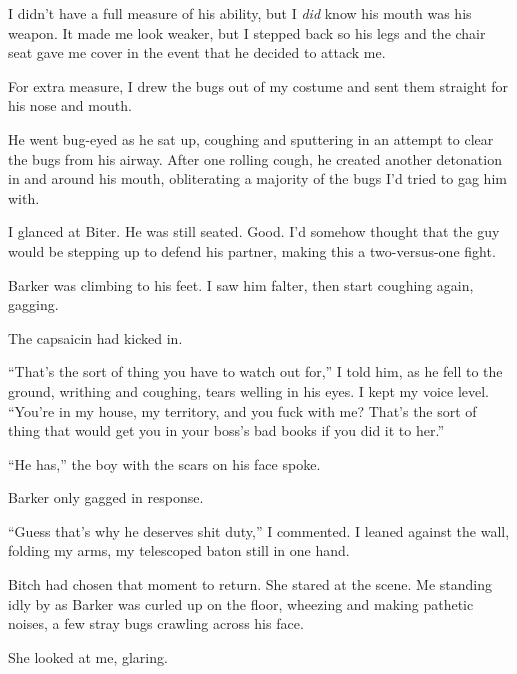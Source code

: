 I didn't have a full measure of his ability, but I \emph{did} know his mouth was his weapon.  It made me look weaker, but I stepped back so his legs and the chair seat gave me cover in the event that he decided to attack me.



For extra measure, I drew the bugs out of my costume and sent them straight for his nose and mouth.



He went bug-eyed as he sat up, coughing and sputtering in an attempt to clear the bugs from his airway.  After one rolling cough, he created another detonation in and around his mouth, obliterating a majority of the bugs I'd tried to gag him with.



I glanced at Biter.  He was still seated.  Good.  I'd somehow thought that the guy would be stepping up to defend his partner, making this a two-versus-one fight.



Barker was climbing to his feet.  I saw him falter, then start coughing again, gagging.



The capsaicin had kicked in.



``That's the sort of thing you have to watch out for,'' I told him, as he fell to the ground, writhing and coughing, tears welling in his eyes.  I kept my voice level.  ``You're in my house, my territory, and you fuck with me?  That's the sort of thing that would get you in your boss's bad books if you did it to her.''



``He has,'' the boy with the scars on his face spoke.



Barker only gagged in response.



``Guess that's why he deserves shit duty,'' I commented.  I leaned against the wall, folding my arms, my telescoped baton still in one hand.



Bitch had chosen that moment to return.  She stared at the scene.  Me standing idly by as Barker was curled up on the floor, wheezing and making pathetic noises, a few stray bugs crawling across his face.



She looked at me, glaring.



